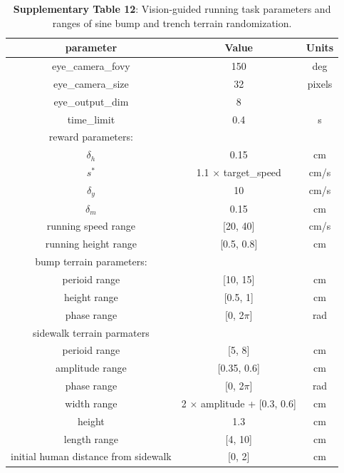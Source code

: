 \documentclass[sn-mathphys-num]{sn-jnl}%
\theoremstyle{thmstyleone}%
\theoremstyle{thmstyletwo}%
\theoremstyle{thmstylethree}%
\begin{document}
\begin{appendices}
\begin{table}[htbp]
	\centering
	\small
	\caption{\textbf{Supplementary Table 12}: 
		Vision-guided running task parameters and ranges of sine bump and trench terrain randomization.
	}
	\begin{tabular}{ccc}
		\toprule
		\textbf{parameter}        &        \textbf{Value}  & \textbf{Units}   \\
		\midrule
		eye\_camera\_fovy     &  150     &  deg \\
		eye\_camera\_size     &  32     &  pixels \\
		eye\_output\_dim     &  8     &   \\
		time\_limit     &  0.4     &  s \\
		\midrule
		reward parameters:     &       &   \\
		$ \delta_h $     &   0.15    &  cm \\
		$ s^{*} $     &   1.1 $ \times $ target\_speed    &  cm/s \\
		$ \delta_y $     &   10    &  cm/s \\
		$ \delta_m $     &   0.15    &  cm \\
		\midrule
		running speed range     &   [20, 40]    &  cm/s \\
		running height range     &   [0.5, 0.8]    &  cm \\
		\midrule
		bump terrain parameters:     &       &   \\
		\quad perioid range     &   [10, 15]    &  cm \\
		\quad height range     &   [0.5, 1]    &  cm \\
		\quad phase range     &   [0, 2$ \pi $]    &  rad \\
		\midrule
		sidewalk terrain parmaters     &       &   \\
		\quad perioid range     &   [5, 8]    &  cm \\
		\quad amplitude range     &   [0.35, 0.6]    &  cm \\
		\quad phase range     &   [0, 2$ \pi $]    &  rad \\
		\quad width range     &   2 $ \times $ amplitude + [0.3, 0.6]    &  cm \\
		\quad height     &   1.3    &  cm \\
		\quad length range     &   [4, 10]    &  cm \\
		\quad initial human distance from sidewalk     &   [0, 2]    &  cm \\
		\bottomrule
	\end{tabular}%
	\label{tab:s_12}%
\end{table}%




\end{appendices}
\end{document}
